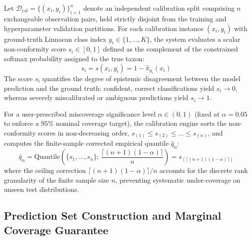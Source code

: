 Let $\mathcal{D}_{\text{cal}} = \{(x_i, y_i)\}_{i=1}^n$ denote an independent calibration split comprising $n$ exchangeable observation pairs, held strictly disjoint from the training and hyperparameter validation partitions. For each calibration instance $(x_i, y_i)$ with ground-truth Linnaean class index $y_i \in \{1, \dots, K\}$, the system evaluates a scalar non-conformity score $s_i \in [0, 1]$ defined as the complement of the constrained softmax probability assigned to the true taxon:
\begin{equation}
s_i = s(x_i, y_i) = 1 - \hat{\pi}_{y_i}(x_i)
\label{eq:nonconformity_score}
\end{equation}
The score $s_i$ quantifies the degree of epistemic disagreement between the model prediction and the ground truth: confident, correct classifications yield $s_i \to 0$, whereas severely miscalibrated or ambiguous predictions yield $s_i \to 1$.

For a user-prescribed miscoverage significance level $\alpha \in (0, 1)$ (fixed at $\alpha = 0.05$ to enforce a $95\%$ nominal coverage target), the calibration engine sorts the non-conformity scores in non-decreasing order, $s_{(1)} \le s_{(2)} \le \dots \le s_{(n)}$, and computes the finite-sample corrected empirical quantile $\hat{q}_\alpha$:
\begin{equation}
\hat{q}_\alpha = \text{Quantile}\left( \{s_1, \dots, s_n\}; \, \frac{\lceil (n + 1)(1 - \alpha) \rceil}{n} \right) = s_{(\lceil (n + 1)(1 - \alpha) \rceil)}
\label{eq:conformal_quantile}
\end{equation}
where the ceiling correction $\lceil (n + 1)(1 - \alpha) \rceil / n$ accounts for the discrete rank granularity of the finite sample size $n$, preventing systematic under-coverage on unseen test distributions.

\subsection{Prediction Set Construction and Marginal Coverage Guarantee}
\label{subsec:conformal_guarantee}

